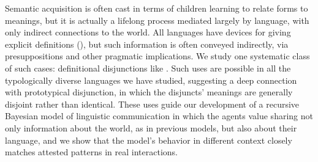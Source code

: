 Semantic acquisition is often cast in terms of children learning to
relate forms to meanings, but it is actually a lifelong process
mediated largely by language, with only indirect connections to the
world.  All languages have devices for giving explicit definitions
(), but such information is often
conveyed indirectly, via presuppositions and other pragmatic
implications. We study one systematic class of such cases:
definitional disjunctions like .  Such
uses are possible in all the typologically diverse languages we have
studied, suggesting a deep connection with prototypical disjunction, in
which the disjuncts' meanings are generally disjoint rather than
identical. These uses guide our development of a recursive Bayesian
model of linguistic communication in which the agents value sharing
not only information about the world, as in previous models, but also
about their language, and we show that the model's behavior in
different context closely matches attested patterns in real
interactions.

